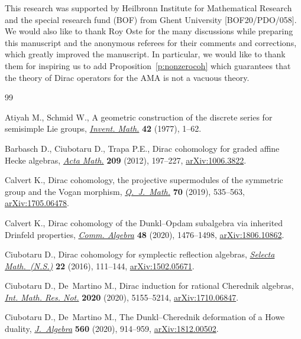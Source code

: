 \documentclass[pdftex]{sigma}
\numberwithin{equation}{section}
\begin{document}
This research was supported by Heilbronn Institute for Mathematical Research and the special research fund (BOF) from Ghent University [BOF20/PDO/058].
We would also like to thank Roy Oste for the many discussions while preparing this manuscript and the anonymous referees for their comments and corrections, which greatly improved the manuscript. In particular, we would like to thank them for inspiring us to add Proposition~\ref{p:nonzerocoh} which guarantees that the theory of Dirac operators for the AMA is not a vacuous theory.

\begin{thebibliography}{99}
\footnotesize\itemsep=0pt

Atiyah M., Schmid W., A geometric construction of the discrete series for
 semisimple {L}ie groups, \href{https://doi.org/10.1007/BF01389783}{\textit{Invent. Math.}} \textbf{42} (1977), 1--62.

Barbasch D., Ciubotaru D., Trapa P.E., Dirac cohomology for graded affine
 {H}ecke algebras, \href{https://doi.org/10.1007/s11511-012-0085-3}{\textit{Acta Math.}} \textbf{209} (2012), 197--227,
 \href{https://arxiv.org/abs/1006.3822}{arXiv:1006.3822}.

Calvert K., Dirac cohomology, the projective supermodules of the symmetric
 group and the {V}ogan morphism, \href{https://doi.org/10.1093/qmath/hay057}{\textit{Q.~J.~Math.}} \textbf{70} (2019),
 535--563, \href{https://arxiv.org/abs/1705.06478}{arXiv:1705.06478}.

Calvert K., Dirac cohomology of the {D}unkl--{O}pdam subalgebra via inherited
 {D}rinfeld properties, \href{https://doi.org/10.1080/00927872.2019.1691567}{\textit{Comm. Algebra}} \textbf{48} (2020), 1476--1498,
 \href{https://arxiv.org/abs/1806.10862}{arXiv:1806.10862}.

Ciubotaru D., Dirac cohomology for symplectic reflection algebras,
 \href{https://doi.org/10.1007/s00029-015-0189-7}{\textit{Selecta Math.~(N.S.)}} \textbf{22} (2016), 111--144,
 \href{https://arxiv.org/abs/1502.05671}{arXiv:1502.05671}.

Ciubotaru D., De~Martino M., Dirac induction for rational {C}herednik algebras,
 \href{https://doi.org/10.1093/imrn/rny153}{\textit{Int. Math. Res. Not.}} \textbf{2020} (2020), 5155--5214,
 \href{https://arxiv.org/abs/1710.06847}{arXiv:1710.06847}.

Ciubotaru D., De~Martino M., The {D}unkl--{C}herednik deformation of a {H}owe
 duality, \href{https://doi.org/10.1016/j.jalgebra.2020.05.034}{\textit{J.~Algebra}} \textbf{560} (2020), 914--959,
 \href{https://arxiv.org/abs/1812.00502}{arXiv:1812.00502}.


\end{thebibliography}
\end{document}
